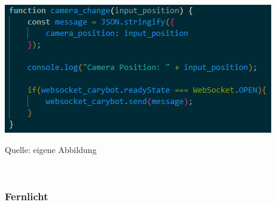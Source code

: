 \documentclass[ngerman,12pt,a4paper]{article}
\begin{document}
	\begin{center}
		\begin{minipage}[t]{0.75\textwidth}
			\includegraphics{Pictures/kamera-js}
			\label{fig:kamera-js}
			\vspace{-10pt}
			\begin{center}
				\par\small Quelle: eigene Abbildung 
			\end{center}
		\end{minipage} \\[0.5cm]
	\end{center}	
				\subsubsection*{Fernlicht}
				
\end{document}
